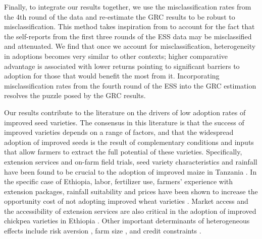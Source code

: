 \documentclass[11pt]{article}
\begin{document}
Finally, to integrate our results together, we use the misclassification rates from the 4th round of the data and re-estimate the GRC results to be robust to misclassification. This method takes inspiration from \cite{michuda2021three} to account for the fact that the self-reports from the first three rounds of the ESS data may be misclassified and attenuated. We find that once we account for misclassification, heterogeneity in adoptions becomes very similar to other contexts; higher comparative advantage is associated with lower returns pointing to significant barriers to adoption for those that would benefit the most from it. Incorporating misclassification rates from the fourth round of the ESS into the GRC estimation resolves the puzzle posed by the GRC results.

Our results contribute to the literature on the drivers of low adoption rates of improved seed varieties. The consensus in this literature is that the success of improved varieties depends on a range of factors, and that the widespread adoption of  improved seeds is the result of complementary conditions and inputs that allow farmers to extract the full potential of these varieties. Specifically, extension services and on-farm field trials, seed variety characteristics and rainfall have been found to be crucial to the adoption of improved maize in Tanzania \citep{Kaliba2000-jh}. In the specific case of Ethiopia, labor, fertilizer use, farmers’ experience with extension packages, rainfall suitability and prices have been shown to increase the opportunity cost of not adopting improved wheat varieties \citep{Wale2006-bv}. Market access and the accessibility of extension services are also critical in the adoption of improved chickpea varieties in Ethiopia \citep{Verkaart2019-ol}. Other important determinants of heterogeneous effects include risk aversion \citep{Holden2016-vy}, farm size \citep{Ghimire2015-bd}, and credit constraints \citep{Simtowe2008-jn,Balana2020-hx}. 


\end{document}
